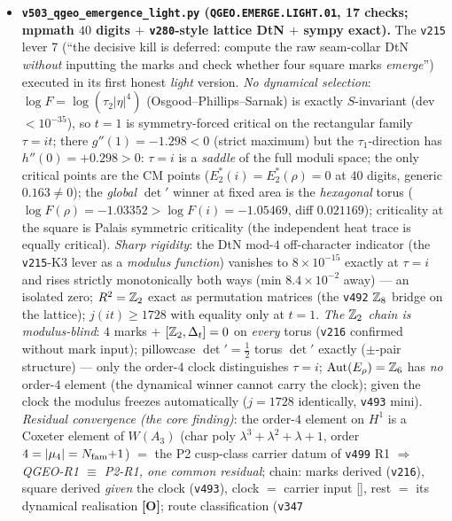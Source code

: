 \documentclass[11pt]{article}
\providecommand{\mO}{\textbf{[O]}}\providecommand{\mX}{\textbf{[X]}}
\begin{document}
\begin{itemize}[leftmargin=1.5em]
\item \textbf{\texttt{v503\_qgeo\_emergence\_light.py} (\texttt{QGEO.EMERGE.LIGHT.01}, 17 checks;
mpmath $40$ digits $+$ \texttt{v280}-style lattice DtN $+$ sympy exact).} The \texttt{v215} lever 7
(``the decisive kill is deferred: compute the raw seam-collar DtN \emph{without} inputting the marks
and check whether four square marks \emph{emerge}'') executed in its first honest \emph{light}
version. \emph{No dynamical selection}: $\log F=\log(\tau_2|\eta|^4)$ (Osgood--Phillips--Sarnak) is
exactly $S$-invariant (dev $<10^{-35}$), so $t{=}1$ is symmetry-forced critical on the rectangular
family $\tau=it$; there $g''(1)=-1.298<0$ (strict maximum) but the $\tau_1$-direction has
$h''(0)=+0.298>0$: $\tau{=}i$ is a \emph{saddle} of the full moduli space; the only critical points
are the CM points ($E_2^*(i)=E_2^*(\rho)=0$ at $40$ digits, generic $0.163\neq0$); the \emph{global}
$\det{}'$ winner at fixed area is the \emph{hexagonal} torus ($\log F(\rho)=-1.03352>\log
F(i)=-1.05469$, diff $0.021169$); criticality at the square is Palais symmetric criticality (the
independent heat trace is equally critical). \emph{Sharp rigidity}: the DtN mod-$4$ off-character
indicator (the \texttt{v215}-K3 lever as a \emph{modulus function}) vanishes to $8\times10^{-15}$
exactly at $\tau{=}i$ and rises strictly monotonically both ways (min $8.4\times10^{-2}$ away) ---
an isolated zero; $R^2=\mathbb{Z}_2$ exact as permutation matrices (the \texttt{v492} $\mathbb{Z}_8$ bridge on the
lattice); $j(it)\ge1728$ with equality only at $t{=}1$. \emph{The $\mathbb{Z}_2$ chain is modulus-blind}:
$4$ marks $+$ $[\mathbb{Z}_2,\Delta_t]=0$ on \emph{every} torus (\texttt{v216} confirmed without mark
input); pillowcase $\det{}'=\tfrac12$ torus $\det{}'$ exactly ($\pm$-pair structure) --- only the
order-$4$ clock distinguishes $\tau{=}i$; $\mathrm{Aut}(E_\rho)=\mathbb{Z}_6$ has \emph{no} order-$4$
element (the dynamical winner cannot carry the clock); given the clock the modulus freezes
automatically ($j=1728$ identically, \texttt{v493} mini). \emph{Residual convergence (the core
finding)}: the order-$4$ element on $H^1$ is a Coxeter element of $W(A_3)$ (char poly
$\lambda^3{+}\lambda^2{+}\lambda{+}1$, order $4=|\mu_4|=N_{\mathrm{fam}}{+}1$) $=$ the P2 cusp-class carrier
datum of \texttt{v499} R1 $\Rightarrow$ \emph{QGEO-R1 $\equiv$ P2-R1, one common residual}; chain:
marks derived (\texttt{v216}), square derived \emph{given} the clock (\texttt{v493}), clock $=$
carrier input [\mC], rest $=$ its dynamical realisation \mO; route classification (\texttt{v347}

\end{itemize}
\end{document}
